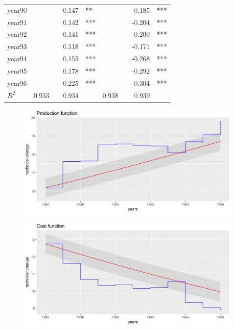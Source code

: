 \documentclass[a4paper]{article}
\begin{document}
\begin{table}[H]
{\begin{tabular}{lrrrrrrrr}
    year90 &       &       & 0.147 & \multicolumn{1}{l}{**} &       &       & -0.185 & \multicolumn{1}{l}{***} \\
    year91 &       &       & 0.142 & \multicolumn{1}{l}{***} &       &       & -0.204 & \multicolumn{1}{l}{***} \\
    year92 &       &       & 0.141 & \multicolumn{1}{l}{***} &       &       & -0.200 & \multicolumn{1}{l}{***} \\
    year93 &       &       & 0.118 & \multicolumn{1}{l}{***} &       &       & -0.171 & \multicolumn{1}{l}{***} \\
    year94 &       &       & 0.155 & \multicolumn{1}{l}{***} &       &       & -0.268 & \multicolumn{1}{l}{***} \\
    year95 &       &       & 0.178 & \multicolumn{1}{l}{***} &       &       & -0.292 & \multicolumn{1}{l}{***} \\
    year96 &       &       & 0.225 & \multicolumn{1}{l}{***} &       &       & -0.304 & \multicolumn{1}{l}{***} \\ \hline
    $R^2$  & 0.933 &       & 0.934 &       & 0.938 &       & 0.939 &  \\ \hline
    \end{tabular}%
    }
  \label{tab2}%
\end{table}%


\newpage


\begin{figure}[H]
\includegraphics[scale=.90]{Prod_ols}
\end{figure}

\begin{figure}[H]
\includegraphics[scale=.90]{Cost_ols}
\end{figure}
\end{document}
